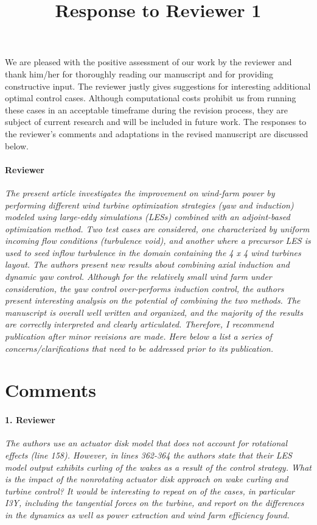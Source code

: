 \documentclass[]{article}
\title{Response to Reviewer 1}
\author{}
\date{}
\begin{document}
\maketitle

We are pleased with the positive assessment of our work by the reviewer and thank him/her for thoroughly reading our manuscript and for providing constructive input. The reviewer justly gives suggestions for interesting additional optimal control cases. Although computational costs prohibit us from running these cases in an acceptable timeframe during the revision process, they are subject of current research and will be included in future work. The responses to the reviewer's comments and adaptations in the revised manuscript are discussed below.

\hrulefill

\paragraph{Reviewer} \textit{The present article investigates the improvement on wind-farm power by performing different wind turbine optimization strategies (yaw and induction) modeled using large-eddy simulations (LESs) combined with an adjoint-based optimization method. Two test cases are considered, one characterized by uniform incoming flow conditions (turbulence void), and another where a precursor LES is used to seed inflow turbulence in the domain containing the 4 x 4 wind turbines layout. The authors present new results about combining axial induction and dynamic yaw control. Although for the relatively small wind farm under consideration, the yaw control over-performs induction control, the authors present interesting analysis on the potential of combining the two methods. The manuscript is overall well written and organized, and the majority of the results are correctly interpreted and clearly articulated. Therefore, I recommend publication after minor 	revisions are made. Here below a list a series of concerns/clarifications that need to be addressed prior to its publication.}


\section*{Comments}
\hrulefill

\paragraph{1. Reviewer} \textit{The authors use an actuator disk model that does not account for rotational effects (line 158). However, in lines 362-364 the authors state that their LES model output exhibits curling of the wakes as a result of the control strategy. What is the impact of the nonrotating actuator disk approach on wake curling and turbine control? It would be interesting to repeat on of the cases, in particular I3Y, including the tangential forces on the turbine, and report on the differences in the dynamics as well as power extraction and wind farm efficiency found.}
\end{document}
